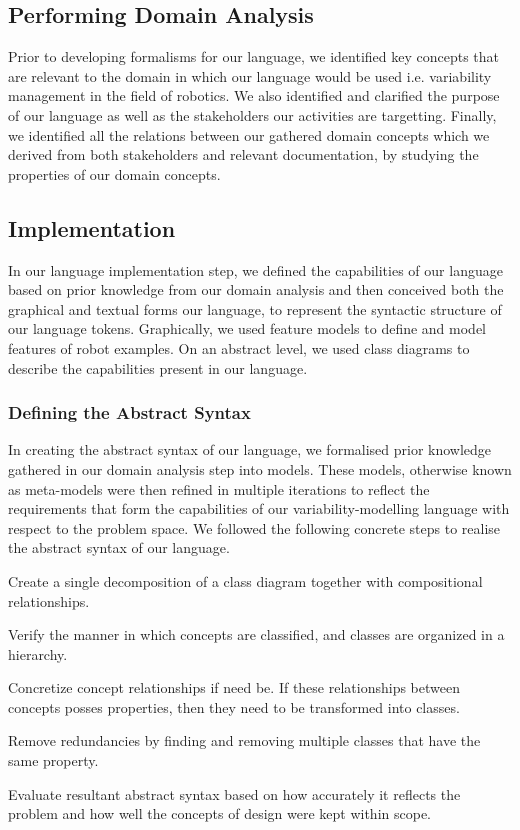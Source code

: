 \documentclass[conference]{IEEEtran}
\begin{document}
\subsection{Performing Domain Analysis}
Prior to developing formalisms for our language, we identified key concepts that are relevant to the domain in which our language would be used i.e. variability management in the field of robotics. We also identified and clarified the purpose of our language as well as the stakeholders our activities are targetting. Finally, we identified all the relations between our gathered domain concepts which we derived from both stakeholders and relevant documentation, by studying the properties of our domain concepts.

\subsection{Implementation}
In our language implementation step, we defined the capabilities of our language based on prior knowledge from our domain analysis and then conceived both the graphical and textual forms our language, to represent the syntactic structure of our language tokens. Graphically, we used feature models to define and model features of robot examples. On an abstract level, we used class diagrams to describe the capabilities present in our language.

\subsubsection{Defining the Abstract Syntax}
In creating the abstract syntax of our language, we formalised prior knowledge gathered in our domain analysis step into models. These models, otherwise known as meta-models were then refined in multiple iterations to reflect the requirements that form the capabilities of our variability-modelling language with respect to the problem space. We followed the following concrete steps to realise the abstract syntax of our language.\begin{enumerate*}
    \item Create a single decomposition of a class diagram together with compositional relationships.
    \item Verify the manner in which concepts are classified, and classes are organized in a hierarchy.
    \item Concretize concept relationships if need be. If these relationships between concepts posses properties, then they need to be transformed into classes.
    \item Remove redundancies by finding and removing multiple classes that have the same property.
    \item Evaluate resultant abstract syntax based on how accurately it reflects the problem and how well the concepts of design were kept within scope.
\end{enumerate*}
\end{document}
